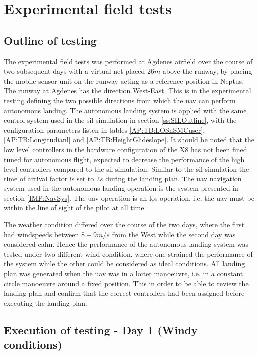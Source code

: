 \chapter{Experimental field tests}\label{Ch:ExperimentalTesting}
\section{Outline of testing}
The experimental field tests was performed at Agdenes airfield over the course of two subsequent days with a virtual net placed $26 m$ above the runway, by placing the mobile sensor unit on the runway acting as a reference position in Neptus. The runway at Agdenes has the direction West-East. This is in the experimental testing defining the two possible directions from which the \gls{uav} can perform autonomous landing. The autonomous landing system is applied with the same control system used in the \gls{sil} simulation in section \ref{ss:SILOutline}, with the configuration parameters listen in tables \ref{AP:TB:LOSnSMCuser}, \ref{AP:TB:Longitudianl} and \ref{AP:TB:HeightGlideslope}. It should be noted that the low level controllers in the hardware configuration of the X8 has not been fined tuned for autonomous flight, expected to decrease the performance of the high level controllers compared to the \gls{sil} simulation. Similar to the \gls{sil} simulation the time of arrival factor is set to $2 s$ during the landing plan. The \gls{uav} navigation system used in the autonomous landing operation is the system presented in section \ref{IMP:NavSys}. The \gls{uav} operation is an \gls{los} operation, i.e. the \gls{uav} must be within the line of sight of the pilot at all time.

The weather condition differed over the course of the two days, where the first had windspeeds between $8-9 m/s$ from the West while the second day was considered calm. Hence the performance of the autonomous landing system was tested under two different wind condition, where one strained the performance of the system while the other could be considered as ideal conditions. All landing plan was generated when the \gls{uav} was in a loiter manoeuvre, i.e. in a constant circle manoeuvre around a fixed position. This in order to be able to review the landing plan and confirm that the correct controllers had been assigned before executing the landing plan.
\section{Execution of testing - Day 1 (Windy conditions)}
